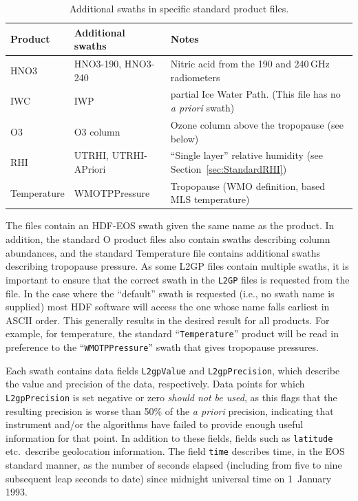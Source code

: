 \documentclass[11pt,draft]{report}
\begin{document}
\begin{table}
  \caption{Additional swaths in specific standard product
    files.\label{tab:SwathExtras}}\small
\begin{center}
\begin{tabular}{>{\ttfamily}l>{\ttfamily}ll}
  \toprule
  \textbf{\rmfamily Product} & \textbf{\rmfamily Additional swaths} &
  \textbf{\rmfamily Notes} \\
  \midrule
  HNO3 & HNO3-190, HNO3-240 & Nitric acid from the 190 and
  240\,GHz radiometers\\
  IWC & IWP & partial Ice Water Path.  (This file has no \emph{a priori} swath) \\
  O3 & O3 column & Ozone column above the tropopause (see below) \\
  RHI & UTRHI, UTRHI-APriori & ``Single layer'' relative humidity (see Section~\ref{sec:StandardRHI})\\
  Temperature & WMOTPPressure & Tropopause (WMO definition, based MLS
  temperature) \\
  \bottomrule
\end{tabular}
\end{center}
\end{table}

The files contain an HDF-EOS swath given the same name as the product.
In addition, the standard O product files also contain swaths
describing column abundances, and the standard Temperature file contains
additional swaths describing tropopause pressure.  As some L2GP files
contain multiple swaths, it is important to ensure that the correct
swath in the \texttt{L2GP} files is requested from the file.  In the
case where the ``default'' swath is requested (i.e., no swath name is
supplied) most HDF software will access the one whose name falls
earliest in ASCII order.  This generally results in the desired result
for all products.  For example, for temperature, the standard
``\texttt{Temperature}'' product will be read in preference to the
``\texttt{WMOTPPressure}'' swath that gives tropopause pressures.

Each swath contains data fields \texttt{L2gpValue} and
\texttt{L2gpPrecision}, which describe the value and precision of the
data, respectively.  Data points for which \texttt{L2gpPrecision} is set
negative or zero \emph{should not be used}, as this flags that the
resulting precision is worse than 50\% of the \emph{a priori} precision,
indicating that instrument and/or the algorithms have failed to provide
enough useful information for that point.  In addition to these fields,
fields such as \texttt{latitude} etc.\ describe geolocation information.
The field \texttt{time} describes time, in the EOS standard manner, as
the number of seconds elapsed (including from five to nine subsequent
leap seconds to date) since midnight universal time on 1~January 1993.
\end{document}
